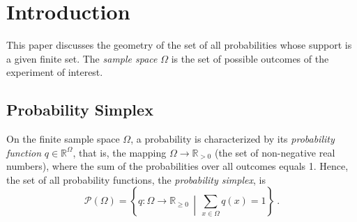 \documentclass[axioms,article,submit,pdftex,moreauthors]{Definitions/mdpi}
\theoremstyle{plain}
\theoremstyle{remark}
\newcommand{\densitieson}[1]{\mathcal P\left(#1\right)}
\newcommand{\nonnegreals}{\mathbb{R}_{\ge 0}}
\newcommand{\posreals}{\mathbb{R}_{>0}}
\newcommand{\reals}{\mathbb{R}}
\newcommand{\setof}[2]{\left\{#1 \, \middle| \, #2 \right\}}
\newcommand{\set}[1]{\left\{#1\right\}}
\begin{document}


\tableofcontents

\section{Introduction} \label{sec:intro}
This paper discusses the geometry of the set of all probabilities whose support is a given finite set. The \emph{sample space} $\Omega$ is the set of possible outcomes of the experiment of interest.

\subsection{Probability Simplex} \label{sec:probability-simplex} 
On the finite sample space \(\Omega\), a probability is characterized by its \emph{probability function}  \(q \in \reals^{\Omega}\), that is, the mapping \(\Omega \to \posreals\) (the set of non-negative real numbers), where the sum of the probabilities over all outcomes equals 1. Hence, the set of all probability functions, the \emph{probability simplex}, is
     \begin{equation} \label{eq:probability-simplex}
          \densitieson \Omega = \setof{q \colon \Omega \to \nonnegreals} {\sum_{x \in \Omega} q(x) = 1} \ .
        \end{equation}
    
\end{document}
